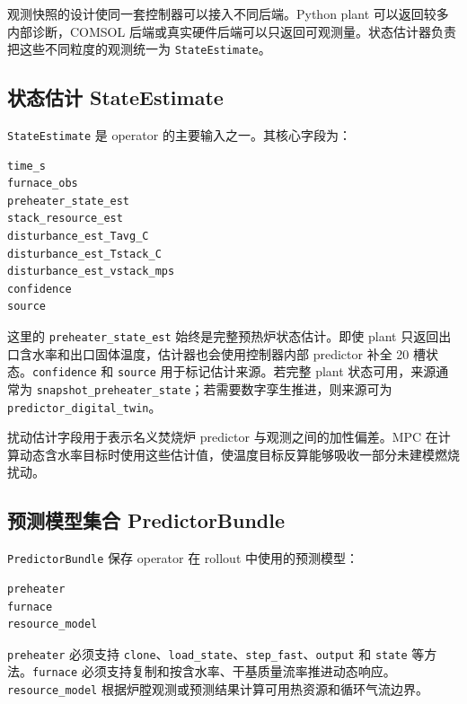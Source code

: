 \documentclass[UTF8,openany,zihao=-4,oneside]{ctexbook}
\providecommand{\passthrough}[1]{#1}
\begin{document}
观测快照的设计使同一套控制器可以接入不同后端。Python plant 可以返回较多内部诊断，COMSOL 后端或真实硬件后端可以只返回可观测量。状态估计器负责把这些不同粒度的观测统一为 \passthrough{\lstinline!StateEstimate!}。

\subsection{状态估计 StateEstimate}\label{subsec:state-estimate}

\passthrough{\lstinline!StateEstimate!} 是 operator 的主要输入之一。其核心字段为：

\begin{lstlisting}
time_s
furnace_obs
preheater_state_est
stack_resource_est
disturbance_est_Tavg_C
disturbance_est_Tstack_C
disturbance_est_vstack_mps
confidence
source
\end{lstlisting}

这里的 \passthrough{\lstinline!preheater_state_est!} 始终是完整预热炉状态估计。即使 plant 只返回出口含水率和出口固体温度，估计器也会使用控制器内部 predictor 补全 20 槽状态。\passthrough{\lstinline!confidence!} 和 \passthrough{\lstinline!source!} 用于标记估计来源。若完整 plant 状态可用，来源通常为 \passthrough{\lstinline!snapshot_preheater_state!}；若需要数字孪生推进，则来源可为 \passthrough{\lstinline!predictor_digital_twin!}。

扰动估计字段用于表示名义焚烧炉 predictor 与观测之间的加性偏差。MPC 在计算动态含水率目标时使用这些估计值，使温度目标反算能够吸收一部分未建模燃烧扰动。

\subsection{预测模型集合 PredictorBundle}\label{subsec:predictor-bundle}

\passthrough{\lstinline!PredictorBundle!} 保存 operator 在 rollout 中使用的预测模型：

\begin{lstlisting}
preheater
furnace
resource_model
\end{lstlisting}

\passthrough{\lstinline!preheater!} 必须支持 \passthrough{\lstinline!clone!}、\passthrough{\lstinline!load_state!}、\passthrough{\lstinline!step_fast!}、\passthrough{\lstinline!output!} 和 \passthrough{\lstinline!state!} 等方法。\passthrough{\lstinline!furnace!} 必须支持复制和按含水率、干基质量流率推进动态响应。\passthrough{\lstinline!resource_model!} 根据炉膛观测或预测结果计算可用热资源和循环气流边界。
\end{document}
